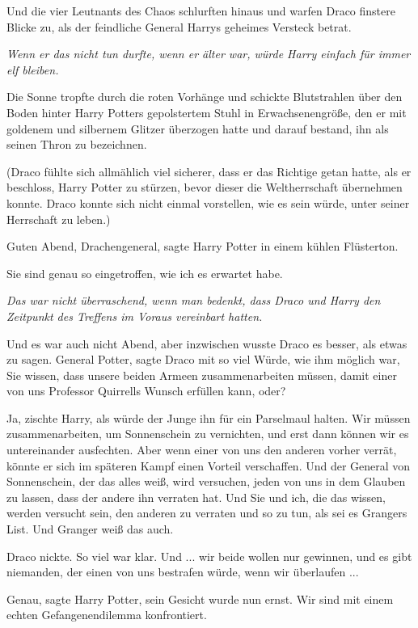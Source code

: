 Und die vier Leutnants des Chaos schlurften hinaus und warfen Draco finstere
Blicke zu, als der feindliche General Harrys geheimes Versteck betrat.

\emph{Wenn er das nicht tun durfte, wenn er älter war, würde Harry einfach für
immer elf bleiben.}

Die Sonne tropfte durch die roten Vorhänge und schickte Blutstrahlen über den
Boden hinter Harry Potters gepolstertem Stuhl in Erwachsenengröße, den er mit
goldenem und silbernem Glitzer überzogen hatte und darauf bestand, ihn als
seinen Thron zu bezeichnen.

(Draco fühlte sich allmählich viel sicherer, dass er das Richtige getan hatte,
als er beschloss, Harry Potter zu stürzen, bevor dieser die Weltherrschaft
übernehmen konnte. Draco konnte sich nicht einmal vorstellen, wie es sein würde,
unter seiner Herrschaft zu leben.)

\glqq{}Guten Abend, Drachengeneral\grqq{}, sagte Harry Potter in einem kühlen
Flüsterton.

\glqq{}Sie sind genau so eingetroffen, wie ich es erwartet habe.\grqq{}

\emph{Das war nicht überraschend, wenn man bedenkt, dass Draco und Harry den
Zeitpunkt des Treffens im Voraus vereinbart hatten.}

Und es war auch nicht Abend, aber inzwischen wusste Draco es besser, als etwas
zu sagen. \glqq{}General Potter\grqq{}, sagte Draco mit so viel Würde, wie ihm
möglich war, \glqq{}Sie wissen, dass unsere beiden Armeen zusammenarbeiten
müssen, damit einer von uns Professor Quirrells Wunsch erfüllen kann, oder?\grqq{}

\glqq{}Ja\grqq{}, zischte Harry, als würde der Junge ihn für ein Parselmaul
halten. \glqq{}Wir müssen zusammenarbeiten, um Sonnenschein zu vernichten, und
erst dann können wir es untereinander ausfechten. Aber wenn einer von uns den
anderen vorher verrät, könnte er sich im späteren Kampf einen Vorteil
verschaffen. Und der General von Sonnenschein, der das alles weiß, wird
versuchen, jeden von uns in dem Glauben zu lassen, dass der andere ihn verraten
hat. Und Sie und ich, die das wissen, werden versucht sein, den anderen zu
verraten und so zu tun, als sei es Grangers List. Und Granger weiß das auch.\grqq{}

Draco nickte. So viel war klar. \glqq{}Und ... wir beide wollen nur gewinnen, und
es gibt niemanden, der einen von uns bestrafen würde, wenn wir überlaufen ...\grqq{}

\glqq{}Genau\grqq{}, sagte Harry Potter, sein Gesicht wurde nun ernst. \glqq{}Wir
sind mit einem echten Gefangenendilemma konfrontiert.\grqq{}

